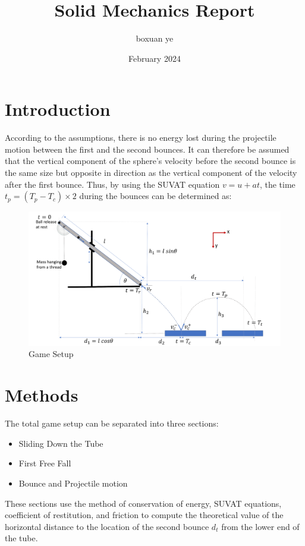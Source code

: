 \documentclass{article}
\title{Solid Mechanics Report}
\author{boxuan ye}
\date{February 2024}
\begin{document}
\maketitle

\newpage
\section{Introduction}
        According to the assumptions, there is no energy lost during the projectile motion between the first and the second bounces. It can therefore be assumed that the vertical component of the sphere's velocity before the second bounce is the same size but opposite in direction as the vertical component of the velocity after the first bounce. Thus, by using the SUVAT equation $v = u + at$, the time $t_p = (T_p - T_c)\times2 $ during the bounces can be determined as:
\begin{figure}[H]
    \centering
    \includegraphics[width=1\linewidth]{Gamesetup.png}
    \caption{Game Setup}
    \label{fig:game_setup}
\end{figure}
\newpage
\section{Methods}
    The total game setup can be separated into three sections:
    \begin{itemize}
        \item Sliding Down the Tube
        \item First Free Fall
        \item Bounce and Projectile motion
    \end{itemize}
    These sections use the method of conservation of energy, SUVAT equations, coefficient of restitution, and friction to compute the theoretical value of the horizontal distance to the location of the second bounce $d_t$ from the lower end of the tube.
    
\end{document}
